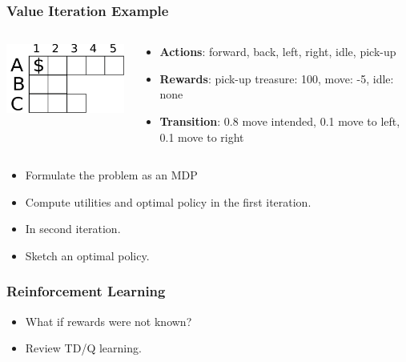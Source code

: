\documentclass[compress, 9pt]{beamer}
\begin{document}
\begin{frame}
\frametitle{Value Iteration Example}
\label{sec-2-2}
\begin{columns}
\begin{column}{0.4\textwidth}
\label{sec-2-2-1}

\includegraphics[width=5cm]{../images/domain.pdf}
\end{column}
\begin{column}{0.5\textwidth}
\label{sec-2-2-2}


\begin{itemize}
\item \textbf{Actions}: forward, back, left, right, idle, pick-up
\item \textbf{Rewards}: pick-up treasure: 100, move: -5, idle: none
\item \textbf{Transition}: 0.8 move intended, 0.1 move to left, 0.1 move to right
\end{itemize}
\end{column}
\end{columns}
\label{sec-2-2-3}

\begin{itemize}
\item Formulate the problem as an MDP
\item Compute utilities and optimal policy in the first iteration.
\item In second iteration.
\item Sketch an optimal policy.
\end{itemize}
\end{frame}
\begin{frame}
\frametitle{Reinforcement Learning}
\label{sec-2-3}

\begin{itemize}
\item What if rewards were not known?
\item Review TD/Q learning.
\end{itemize}
\end{frame}
\end{document}
